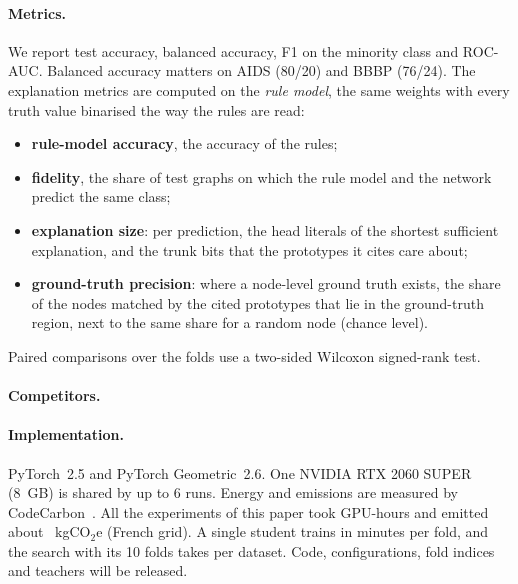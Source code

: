 \paragraph{Metrics.}
We report test accuracy, balanced accuracy, F1 on the minority class and ROC-AUC. Balanced
accuracy matters on AIDS (80/20) and BBBP (76/24). The explanation metrics are computed on the
\emph{rule model}, the same weights with every truth value binarised the way the rules are
read:
\begin{itemize}
  \item \textbf{rule-model accuracy}, the accuracy of the rules;
  \item \textbf{fidelity}, the share of test graphs on which the rule model and the network
    predict the same class;
  \item \textbf{explanation size}: per prediction, the head literals of the shortest
    sufficient explanation, and the trunk bits that the prototypes it cites care about;
  \item \textbf{ground-truth precision}: where a node-level ground truth exists, the share of
    the nodes matched by the cited prototypes that lie in the ground-truth region, next to
    the same share for a random node (chance level).
\end{itemize}
Paired comparisons over the folds use a two-sided Wilcoxon signed-rank test.

\paragraph{Competitors.}

\paragraph{Implementation.}
PyTorch~2.5 and PyTorch Geometric~2.6. One NVIDIA RTX 2060 SUPER (8~GB) is shared by up to 6 runs.
Energy and emissions are measured by CodeCarbon~. All the experiments of this
paper took  GPU-hours and emitted about ~kgCO$_2$e (French grid). A single
student trains in  minutes per fold, and the search with its 10 folds takes
 per dataset. Code, configurations, fold indices and teachers will be
released.

